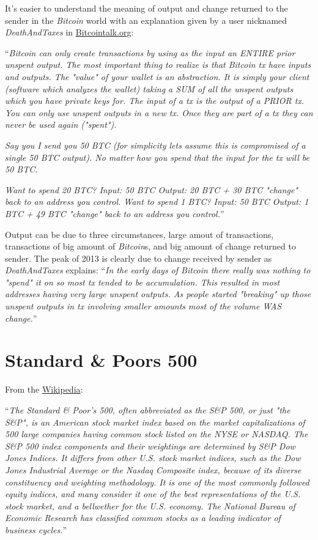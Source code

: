 It's easier to understand the meaning of output and change returned to
the sender in the \textit{Bitcoin} world with an explanation given by
a user nicknamed \textit{DeathAndTaxes} in
\href{https://bitcointalk.org/index.php?topic=99593.0}{Bitcointalk.org}:

``\textit{\textit{Bitcoin} can only create transactions by using as
the input an ENTIRE prior unspent output. The most important thing to
realize is that \textit{Bitcoin} tx have inputs and outputs. The
"value" of your wallet is an abstraction. It is simply your client
(software which analyzes the wallet) taking a SUM of all the unspent
outputs which you have private keys for. The input of a tx is the
output of a PRIOR tx. You can only use unspent outputs in a new tx.
Once they are part of a tx they can never be used again ("spent").}

\textit{Say you I send you 50 BTC (for simplicity lets assume this is
compromised of a single 50 BTC output). No matter how you spend that
the input for the tx will be 50 BTC.}

\textit{Want to spend 20 BTC? Input: 50 BTC Output: 20 BTC + 30 BTC
"change" back to an address you control. Want to spend 1 BTC? Input:
50 BTC Output: 1 BTC + 49 BTC "change" back to an address you
control.}''

Output can be due to three circumstances, large amout of transactions,
transactions of big amount of \textit{Bitcoin}s, and big amount of
change returned to sender. The peak of 2013 is clearly due to change
received by sender as \textit{DeathAndTaxes} explains: ``\textit{In
the early days of \textit{Bitcoin} there really was nothing to "spend"
it on so most tx tended to be accumulation. This resulted in most
addresses having very large unspent outputs. As people started
"breaking" up those unspent outputs in tx involving smaller amounts
most of the volume WAS change.}''


\section{Standard \& Poors 500}
\label{sec:standard-and-poors-500}


From the
\href{https://en.wikipedia.org/wiki/S\%26P_500_Index}{Wikipedia}:

``\textit{The Standard \& Poor's 500, often abbreviated as the S\&P
500, or just "the S\&P", is an American stock market index based on
the market capitalizations of 500 large companies having common stock
listed on the NYSE or NASDAQ. The S\&P 500 index components and their
weightings are determined by S\&P Dow Jones Indices. It differs from
other U.S. stock market indices, such as the Dow Jones Industrial
Average or the Nasdaq Composite index, because of its diverse
constituency and weighting methodology. It is one of the most commonly
followed equity indices, and many consider it one of the best
representations of the U.S. stock market, and a bellwether for the
U.S. economy. The National Bureau of Economic Research has classified
common stocks as a leading indicator of business cycles.}''

